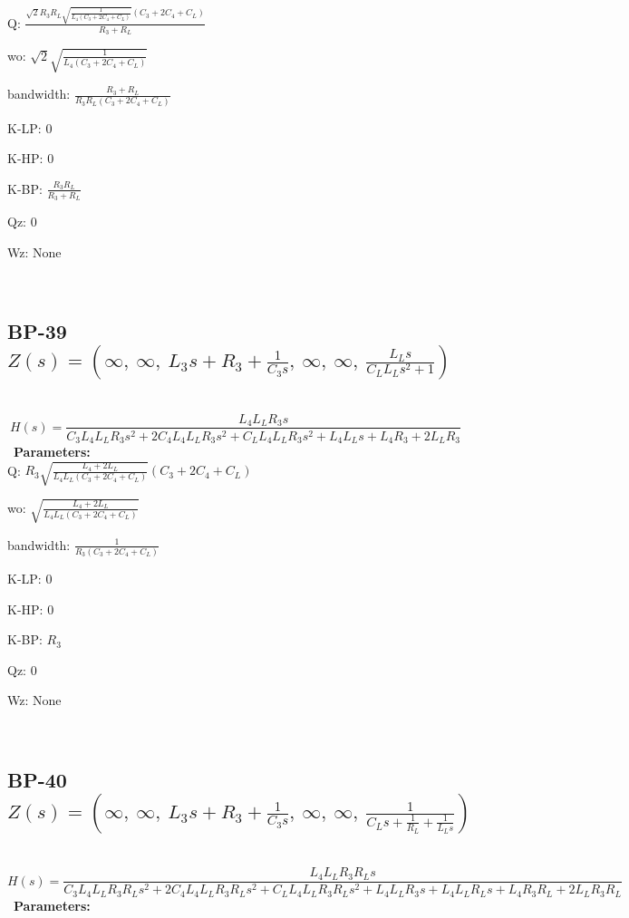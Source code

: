 \documentclass{article}
\begin{document}
Q: $\frac{\sqrt{2} R_{3} R_{L} \sqrt{\frac{1}{L_{4} \left(C_{3} + 2 C_{4} + C_{L}\right)}} \left(C_{3} + 2 C_{4} + C_{L}\right)}{R_{3} + R_{L}}$\ 

wo: $\sqrt{2} \sqrt{\frac{1}{L_{4} \left(C_{3} + 2 C_{4} + C_{L}\right)}}$\ 

bandwidth: $\frac{R_{3} + R_{L}}{R_{3} R_{L} \left(C_{3} + 2 C_{4} + C_{L}\right)}$\ 

K-LP: $0$\ 

K-HP: $0$\ 

K-BP: $\frac{R_{3} R_{L}}{R_{3} + R_{L}}$\ 

Qz: $0$\ 

Wz: $\text{None}$\ 

\ 

\subsection{BP-39 $Z(s) = \left( \infty, \  \infty, \  L_{3} s + R_{3} + \frac{1}{C_{3} s}, \  \infty, \  \infty, \  \frac{L_{L} s}{C_{L} L_{L} s^{2} + 1}\right)$ } \ 
\textbf{\[H(s) = \frac{L_{4} L_{L} R_{3} s}{C_{3} L_{4} L_{L} R_{3} s^{2} + 2 C_{4} L_{4} L_{L} R_{3} s^{2} + C_{L} L_{4} L_{L} R_{3} s^{2} + L_{4} L_{L} s + L_{4} R_{3} + 2 L_{L} R_{3}}\] } \ 
\textbf{Parameters:}\\ 

Q: $R_{3} \sqrt{\frac{L_{4} + 2 L_{L}}{L_{4} L_{L} \left(C_{3} + 2 C_{4} + C_{L}\right)}} \left(C_{3} + 2 C_{4} + C_{L}\right)$\ 

wo: $\sqrt{\frac{L_{4} + 2 L_{L}}{L_{4} L_{L} \left(C_{3} + 2 C_{4} + C_{L}\right)}}$\ 

bandwidth: $\frac{1}{R_{3} \left(C_{3} + 2 C_{4} + C_{L}\right)}$\ 

K-LP: $0$\ 

K-HP: $0$\ 

K-BP: $R_{3}$\ 

Qz: $0$\ 

Wz: $\text{None}$\ 

\ 

\subsection{BP-40 $Z(s) = \left( \infty, \  \infty, \  L_{3} s + R_{3} + \frac{1}{C_{3} s}, \  \infty, \  \infty, \  \frac{1}{C_{L} s + \frac{1}{R_{L}} + \frac{1}{L_{L} s}}\right)$ } \ 
\textbf{\[H(s) = \frac{L_{4} L_{L} R_{3} R_{L} s}{C_{3} L_{4} L_{L} R_{3} R_{L} s^{2} + 2 C_{4} L_{4} L_{L} R_{3} R_{L} s^{2} + C_{L} L_{4} L_{L} R_{3} R_{L} s^{2} + L_{4} L_{L} R_{3} s + L_{4} L_{L} R_{L} s + L_{4} R_{3} R_{L} + 2 L_{L} R_{3} R_{L}}\] } \ 
\textbf{Parameters:}\\ 
\end{document}
